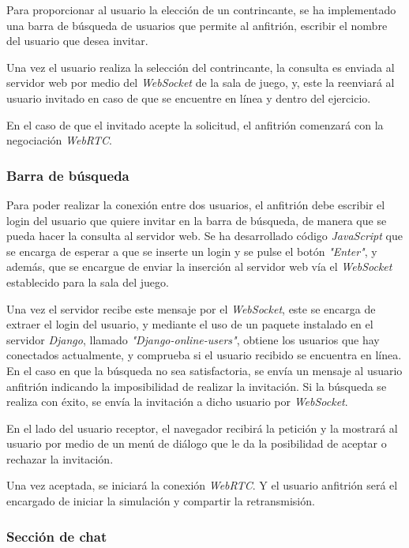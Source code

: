 \documentclass[a4paper, 12pt]{book}
\begin{document}
Para proporcionar al usuario la elección de un contrincante, se ha implementado una barra de búsqueda de usuarios que permite al anfitrión, escribir el nombre del usuario que desea invitar.

Una vez el usuario realiza la selección del contrincante, la consulta es enviada al servidor web por medio del \emph{WebSocket} de la sala de juego, y, este la reenviará al usuario invitado en caso de que se encuentre en línea y dentro del ejercicio.

En el caso de que el invitado acepte la solicitud, el anfitrión comenzará con la negociación \emph{WebRTC}.

\subsubsection{Barra de búsqueda}

Para poder realizar la conexión entre dos usuarios, el anfitrión debe escribir el login del usuario que quiere invitar en la barra de búsqueda, de manera que se pueda hacer la consulta al servidor web. Se ha desarrollado código \emph{JavaScript} que se encarga de esperar a que se inserte un login y se pulse el botón \emph{"Enter"}, y además, que se encargue de enviar la inserción al servidor web vía el \emph{WebSocket} establecido para la sala del juego.

Una vez el servidor recibe este mensaje por el \emph{WebSocket}, este se encarga de extraer el login del usuario, y mediante el uso de un paquete instalado en el servidor \emph{Django}, llamado \emph{"Django-online-users"}, obtiene los usuarios que hay conectados actualmente, y comprueba si el usuario recibido se encuentra en línea. En el caso en que la búsqueda no sea satisfactoria, se envía un mensaje al usuario anfitrión indicando la imposibilidad de realizar la invitación. Si la búsqueda se realiza con éxito, se envía la invitación a dicho usuario por \emph{WebSocket}.

En el lado del usuario receptor, el navegador recibirá la petición y la mostrará al usuario por medio de un menú de diálogo que le da la posibilidad de aceptar o rechazar la invitación.

Una vez aceptada, se iniciará la conexión \emph{WebRTC}. Y el usuario anfitrión será el encargado de iniciar la simulación y compartir la retransmisión.

\subsubsection{Sección de chat}
\end{document}

